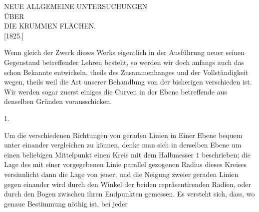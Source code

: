 \clearpage
{}%
\begin{center}\large NEUE ALLGEMEINE UNTERSUCHUNGEN\\[4pt] ÜBER\\[4pt] DIE KRUMMEN FLÄCHEN.\\[7pt] [1825.]\end{center}
\noindent\hspace*{1.2em}Wenn gleich der Zweck dieses Werks eigentlich in der Ausführung neuer seinen Gegenstand betreffender Lehren besteht, so werden wir doch anfangs auch das schon Bekannte entwickeln, theils des Zusammenhanges und der Vollständigkeit wegen, theils weil die Art unserer Behandlung von der bisherigen verschieden ist. Wir werden sogar zuerst einiges die Curven in der Ebene betreffende aus denselben Gründen vorausschicken.

\begin{center}1.\end{center}
\noindent\hspace*{1.2em}Um die verschiedenen Richtungen von geraden Linien in Einer Ebene bequem unter einander vergleichen zu können, denke man sich in derselben Ebene um einen beliebigen Mittelpunkt einen Kreis mit dem Halbmesser $1$ beschrieben; die Lage des mit einer vorgegebenen Linie parallel gezogenen Radius dieses Kreises versinnlicht dann die Lage von jener, und die Neigung zweier geraden Linien gegen einander wird durch den Winkel der beiden repräsentirenden Radien, oder durch den Bogen zwischen ihren Endpunkten gemessen. Es versteht sich, dass, wo genaue Bestimmung nöthig ist, bei jeder
